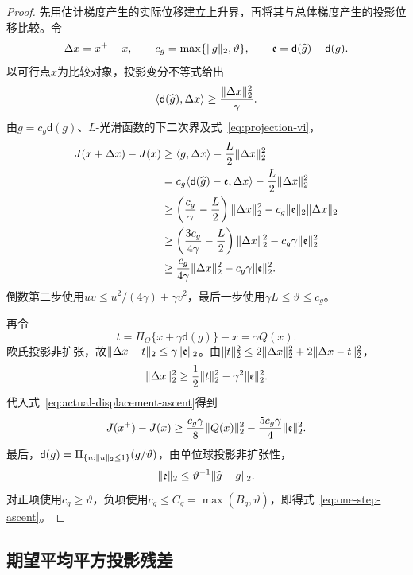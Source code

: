 \begin{proof}
先用估计梯度产生的实际位移建立上升界，再将其与总体梯度产生的投影位移比较。令
\[
 \Delta x=x^+-x,
 \qquad
 c_g=\max\{\lVert g\rVert_2,\vartheta\},
 \qquad
 \mathfrak e=\mathsf d(\widehat g)-\mathsf d(g).
\]
以可行点$x$为比较对象，投影变分不等式给出
\begin{equation}\label{eq:projection-vi}
 \langle\mathsf d(\widehat g),\Delta x\rangle\ge\frac{\lVert\Delta x\rVert_2^2}{\gamma}.
\end{equation}
由$g=c_g\mathsf d(g)$、$L$-光滑函数的下二次界及式~\eqref{eq:projection-vi}，
\begin{align}
 J(x+\Delta x)-J(x)
 &\ge \langle g,\Delta x\rangle-\frac L2\lVert\Delta x\rVert_2^2\notag\\
 &=c_g\langle\mathsf d(\widehat g)-\mathfrak e,\Delta x\rangle
 -\frac L2\lVert\Delta x\rVert_2^2\notag\\
 &\ge\left(\frac{c_g}{\gamma}-\frac L2\right)\lVert\Delta x\rVert_2^2
 -c_g\lVert\mathfrak e\rVert_2\lVert\Delta x\rVert_2\notag\\
 &\ge\left(\frac{3c_g}{4\gamma}-\frac L2\right)\lVert\Delta x\rVert_2^2
 -c_g\gamma\lVert\mathfrak e\rVert_2^2\notag\\
 &\ge\frac{c_g}{4\gamma}\lVert\Delta x\rVert_2^2
 -c_g\gamma\lVert\mathfrak e\rVert_2^2.
 \label{eq:actual-displacement-ascent}
\end{align}
倒数第二步使用$uv\le u^2/(4\gamma)+\gamma v^2$，最后一步使用$\gamma L\le\vartheta\le c_g$。

再令
\[
 t=\Pi_\Theta\{x+\gamma\mathsf d(g)\}-x=\gamma Q(x).
\]
欧氏投影非扩张，故$\lVert\Delta x-t\rVert_2\le\gamma\lVert\mathfrak e\rVert_2$。由$\lVert t\rVert_2^2\le2\lVert\Delta x\rVert_2^2+2\lVert\Delta x-t\rVert_2^2$，
\[
 \lVert\Delta x\rVert_2^2\ge\frac12\lVert t\rVert_2^2-\gamma^2\lVert\mathfrak e\rVert_2^2.
\]
代入式~\eqref{eq:actual-displacement-ascent}得到
\[
 J(x^+)-J(x)
 \ge\frac{c_g\gamma}{8}\lVert Q(x)\rVert_2^2
 -\frac{5c_g\gamma}{4}\lVert\mathfrak e\rVert_2^2.
\]
最后，$\mathsf d(g)=\Pi_{\{u:\lVert u\rVert_2\le1\}}(g/\vartheta)$，由单位球投影非扩张性，
\[
 \lVert\mathfrak e\rVert_2\le \vartheta^{-1}\lVert\widehat g-g\rVert_2.
\]
对正项使用$c_g\ge\vartheta$，负项使用$c_g\le C_g=\max(B_g,\vartheta)$，即得式~\eqref{eq:one-step-ascent}。
\end{proof}

\subsection{期望平均平方投影残差}

